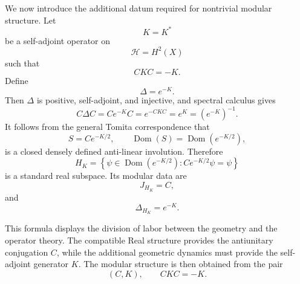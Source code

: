 \documentclass[a4paper,11pt]{article}
\theoremstyle{definition}
\newcommand{\cH}{\mathcal{H}}
\newcommand{\Dom}{\operatorname{Dom}}
\begin{document}
We now introduce the additional datum required for nontrivial modular
structure.  Let
\begin{equation}
    K=K^*
\end{equation}
be a self-adjoint operator on
\begin{equation}
    \cH=H^2(X)
\end{equation}
such that
\begin{equation}
    CKC=-K.
    \label{eq:ssgq:CKC}
\end{equation}
Define
\begin{equation}
    \Delta=e^{-K}.
    \label{eq:ssgq:Deltadef}
\end{equation}
Then $\Delta$ is positive, self-adjoint, and injective, and spectral calculus
gives
\begin{equation}
    C\Delta C
    =
    Ce^{-K}C
    =
    e^{-CKC}
    =
    e^{K}
    =
    \left(e^{-K}\right)^{-1}.
\end{equation}
It follows from the general Tomita correspondence that
\begin{equation}
    S
    =
    Ce^{-K/2},
    \qquad
    \Dom(S)=\Dom(e^{-K/2}),
    \label{eq:ssgq:Sgeometric}
\end{equation}
is a closed densely defined anti-linear involution.  Therefore
\begin{equation}
    H_K
    =
    \left\{
    \psi\in\Dom(e^{-K/2}):
    Ce^{-K/2}\psi=\psi
    \right\}
    \label{eq:ssgq:HK}
\end{equation}
is a standard real subspace.  Its modular data are
\begin{equation}
    J_{H_K}=C,
\end{equation}
and
\begin{equation}
    \Delta_{H_K}=e^{-K}.
    \label{eq:ssgq:DeltaHK}
\end{equation}

This formula displays the division of labor between the geometry and the
operator theory.  The compatible Real structure provides the antiunitary
conjugation $C$, while the additional geometric dynamics must provide the
self-adjoint generator $K$.  The modular structure is then obtained from the
pair
\begin{equation}
    (C,K),
    \qquad
    CKC=-K.
\end{equation}
\end{document}
